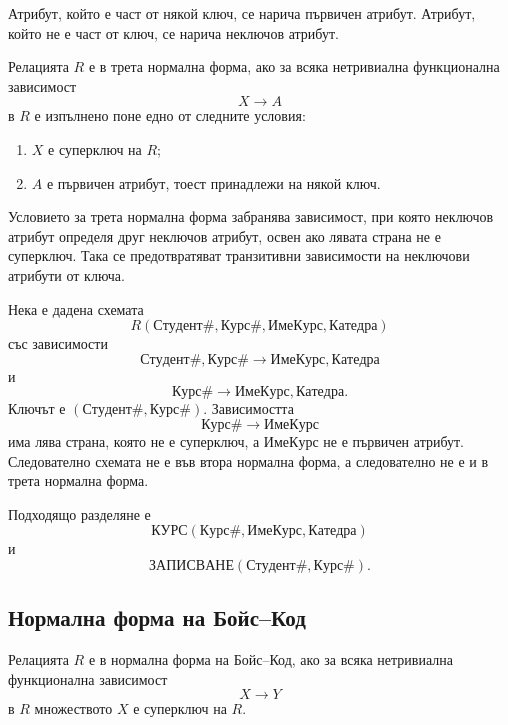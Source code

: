 \begin{defn}
Атрибут, който е част от някой ключ, се нарича първичен атрибут. Атрибут, който не е част от ключ, се нарича неключов атрибут.
\end{defn}

\begin{defn}
Релацията $R$ е в трета нормална форма, ако за всяка нетривиална функционална зависимост
\[
X\to A
\]
в $R$ е изпълнено поне едно от следните условия:

\begin{enumerate}
    \item $X$ е суперключ на $R$;
    \item $A$ е първичен атрибут, тоест принадлежи на някой ключ.
\end{enumerate}
\end{defn}

Условието за трета нормална форма забранява зависимост, при която неключов атрибут определя друг неключов атрибут, освен ако лявата страна не е суперключ. Така се предотвратяват транзитивни зависимости на неключови атрибути от ключа.

\begin{example}
Нека е дадена схемата
\[
R(\mathrm{Студент\#},\mathrm{Курс\#},\mathrm{ИмеКурс},\mathrm{Катедра})
\]
със зависимости
\[
\mathrm{Студент\#},\mathrm{Курс\#}\to\mathrm{ИмеКурс},\mathrm{Катедра}
\]
и
\[
\mathrm{Курс\#}\to\mathrm{ИмеКурс},\mathrm{Катедра}.
\]
Ключът е $(\mathrm{Студент\#},\mathrm{Курс\#})$. Зависимостта
\[
\mathrm{Курс\#}\to\mathrm{ИмеКурс}
\]
има лява страна, която не е суперключ, а $\mathrm{ИмеКурс}$ не е първичен атрибут. Следователно схемата не е във втора нормална форма, а следователно не е и в трета нормална форма.

Подходящо разделяне е
\[
\mathrm{КУРС}(\mathrm{Курс\#},\mathrm{ИмеКурс},\mathrm{Катедра})
\]
и
\[
\mathrm{ЗАПИСВАНЕ}(\mathrm{Студент\#},\mathrm{Курс\#}).
\]
\end{example}

\subsection{Нормална форма на Бойс--Код}\label{s:24.1.9}

\begin{defn}
Релацията $R$ е в нормална форма на Бойс--Код, ако за всяка нетривиална функционална зависимост
\[
X\to Y
\]
в $R$ множеството $X$ е суперключ на $R$.
\end{defn}

